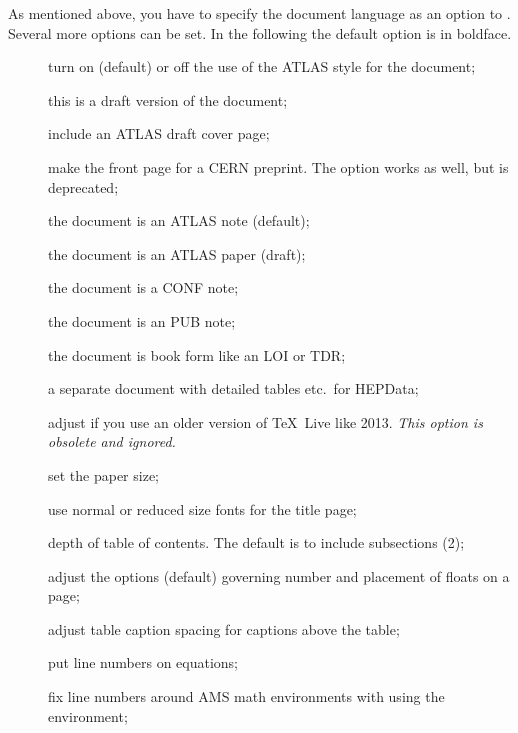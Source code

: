 As mentioned above, you have to specify the document language as an option to .
Several more options can be set.
In the following the default option is in boldface.
\begin{description}
\item[] turn on (default) or off the use of the ATLAS style for the document;
\item[] this is a draft version of the document;
\item[] include an ATLAS draft cover page;
\item[] make the front page for a CERN preprint.
  The option  works as well, but is deprecated;
\item[] the document is an ATLAS note (default);
\item[] the document is an ATLAS paper (draft);
\item[] the document is a CONF note;
\item[] the document is an PUB note;
\item[] the document is book form like an LOI or TDR;
\item[] a separate document with detailed tables etc.\ for HEPData;
\item[] adjust if you use an older version of \TeX\ Live like 2013.
  \emph{ This option is obsolete and ignored.}
\item[] set the paper size;
\item[] use normal or reduced size fonts for the title page;
\item[] depth of table of contents. The default is to include subsections (2);
\item[] adjust the options (default) governing number and placement of floats on a page;
\item[] adjust table caption spacing for captions above the table;
\item[] put line numbers on equations;
\item[] fix line numbers around AMS math environments with using the  environment;

\end{description}
